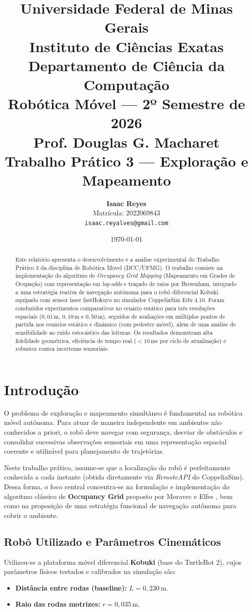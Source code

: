 \documentclass[11pt,a4paper]{article}
\title{
    \vspace{-1.0cm}
    \textbf{Universidade Federal de Minas Gerais} \\
    \textbf{Instituto de Ciências Exatas} \\
    \textbf{Departamento de Ciência da Computação} \\
    \vspace{0.4cm}
    \large Robótica Móvel — 2º Semestre de 2026 \\
    \large Prof. Douglas G. Macharet \\
    \vspace{0.6cm}
    \LARGE \textbf{Trabalho Prático 3 — Exploração e Mapeamento}
}
\author{
    \textbf{Isaac Reyes} \\
    Matrícula: 2022069843 \\
    \texttt{isaac.reyalves@gmail.com}
}
\date{\today}
\begin{document}
\maketitle

\begin{abstract}
Este relatório apresenta o desenvolvimento e a análise experimental do Trabalho Prático 3 da disciplina de Robótica Móvel (DCC/UFMG). O trabalho consiste na implementação do algoritmo de \textit{Occupancy Grid Mapping} (Mapeamento em Grades de Ocupação) com representação em \textit{log-odds} e traçado de raios por Bresenham, integrado a uma estratégia reativa de navegação autônoma para o robô diferencial Kobuki equipado com sensor laser fastHokuyo no simulador CoppeliaSim Edu 4.10. Foram conduzidos experimentos comparativos no cenário estático para três resoluções espaciais ($0{,}01$\,m, $0{,}10$\,m e $0{,}50$\,m), seguidos de avaliações em múltiplos pontos de partida nos cenários estático e dinâmico (com pedestre móvel), além de uma análise de sensibilidade ao ruído estocástico das leituras. Os resultados demonstram alta fidelidade geométrica, eficiência de tempo real ($<10$\,ms por ciclo de atualização) e robustez contra incertezas sensoriais.
\end{abstract}

\vspace{0.2cm}

\section{Introdução}

O problema de exploração e mapeamento simultâneo é fundamental na robótica móvel autônoma. Para atuar de maneira independente em ambientes não conhecidos a priori, o robô deve navegar com segurança, desviar de obstáculos e consolidar sucessivas observações sensoriais em uma representação espacial coerente e utilizável para planejamento de trajetórias.

Neste trabalho prático, assume-se que a localização do robô é perfeitamente conhecida a cada instante (obtida diretamente via \textit{RemoteAPI} do CoppeliaSim). Dessa forma, o foco central concentra-se na formulação e implementação do algoritmo clássico de \textbf{Occupancy Grid} proposto por Moravec e Elfes \cite{moravec1985}, bem como na proposição de uma estratégia funcional de navegação autônoma para cobrir o ambiente.

\subsection{Robô Utilizado e Parâmetros Cinemáticos}
Utilizou-se a plataforma móvel diferencial \textbf{Kobuki} (base do TurtleBot 2), cujos parâmetros físicos testados e calibrados na simulação são:
\begin{itemize}
    \item \textbf{Distância entre rodas (baseline):} $L = 0{,}230$\,m.
    \item \textbf{Raio das rodas motrizes:} $r = 0{,}035$\,m.
\end{itemize}
\end{document}
